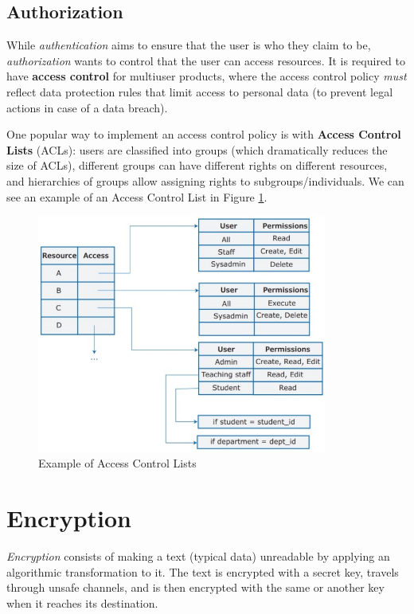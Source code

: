 \subsection{Authorization}

While \textit{authentication} aims to ensure that the user is who they claim to be, \textit{authorization} wants to control that the user can access resources. It is required to have \textbf{access control} for multiuser products, where the access control policy \textit{must} reflect data protection rules that limit access to personal data (to prevent legal actions in case of a data breach).

One popular way to implement an access control policy is with \textbf{Access Control Lists} (ACLs): users are classified into groups (which dramatically reduces the size of ACLs), different groups can have different rights on different resources, and hierarchies of groups allow assigning rights to subgroups/individuals. We can see an example of an Access Control List in Figure \ref{fig:ACLs}.

\begin{figure} [H]
    \centering
    \includegraphics[width=0.85\textwidth]{images/Security/ACL.png}
    \caption{Example of Access Control Lists}
    \label{fig:ACLs}
\end{figure}

\section{Encryption}

\textit{Encryption} consists of making a text (typical data) unreadable by applying an algorithmic transformation to it. The text is encrypted with a secret key, travels through unsafe channels, and is then encrypted with the same or another key when it reaches its destination.

